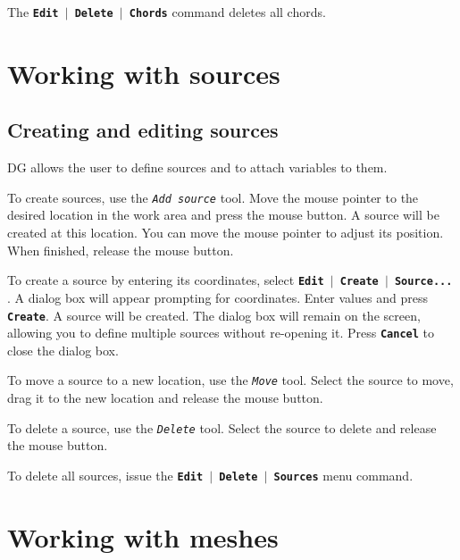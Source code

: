 \documentclass[12pt]{report}
\begin{document}
The \textbf{\texttt{Edit $\mid$ Delete $\mid$ Chords}} command
deletes all chords.

\chapter{Working with sources}

\section{Creating and editing sources}

DG allows the user to define sources and to attach variables to them.

To create sources, use the \textit{\texttt{Add source}} tool. Move the
mouse pointer to the desired location in the work area and press the
mouse button. A source will be created at this location. You can move
the mouse pointer to adjust its position. When finished, release the
mouse button.

To create a source by entering its coordinates, select
\textbf{\texttt{Edit  \begin{math}\vert{}\end{math}  Create  \begin{math}\vert{}\end{math}  Source...}}
. A dialog box will appear prompting for coordinates. Enter values and
press \textbf{\texttt{Create}}. A source will be created. The dialog
box will remain on the screen, allowing you to define multiple sources
without re-opening it. Press \textbf{\texttt{Cancel}} to close the
dialog box.

To move a source to a new location, use the
\textit{\texttt{Move}} tool. Select the source to move, drag it
to the new location and release the mouse button.

To delete a source, use the \textit{\texttt{Delete}} tool. Select the
source to delete and release the mouse button.

To delete all sources, issue the
\textbf{\texttt{Edit  \begin{math}\vert{}\end{math}  Delete  \begin{math}\vert{}\end{math} Sources}}
menu command.

\chapter{Working with meshes}
\end{document}
